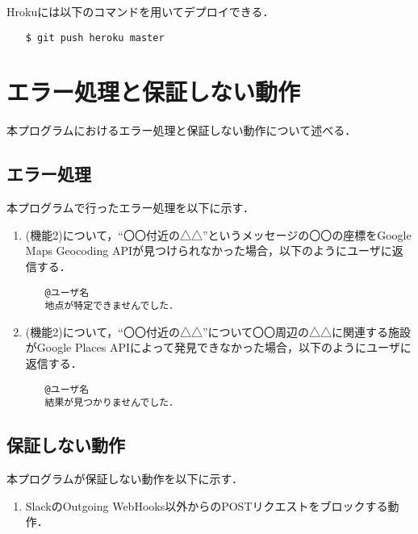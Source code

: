 \documentclass[fleqn, 14pt]{extarticlej}
\begin{document}
Hrokuには以下のコマンドを用いてデプロイできる．

\begin{verbatim}
　　$ git push heroku master
\end{verbatim}

\section{エラー処理と保証しない動作}
本プログラムにおけるエラー処理と保証しない動作について述べる．

\subsection{エラー処理}
本プログラムで行ったエラー処理を以下に示す．

\begin{enumerate}
\item (機能2)について，``〇〇付近の△△''というメッセージの〇〇の座標をGoogle Maps Geocoding APIが見つけられなかった場合，以下のようにユーザに返信する．
\begin{verbatim}
　　@ユーザ名
　　地点が特定できませんでした．
\end{verbatim}
\item (機能2)について，``〇〇付近の△△''について〇〇周辺の△△に関連する施設がGoogle Places APIによって発見できなかった場合，以下のようにユーザに返信する．
\begin{verbatim}
　　@ユーザ名
　　結果が見つかりませんでした．
\end{verbatim}
\end{enumerate}
\subsection{保証しない動作}
本プログラムが保証しない動作を以下に示す．

\begin{enumerate}
\item SlackのOutgoing WebHooks以外からのPOSTリクエストをブロックする動作．
\end{enumerate}



\end{document}
